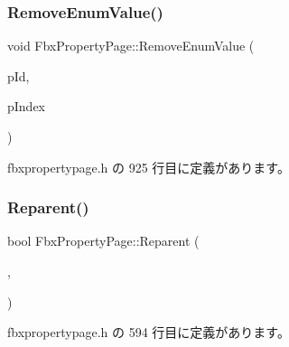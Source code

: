\mbox{\label{class_fbx_property_page_a342af6839e0b286988b8f7fe71f9675c}} 
\subsubsection{\texorpdfstring{Remove\+Enum\+Value()}{RemoveEnumValue()}}
{\footnotesize\ttfamily void Fbx\+Property\+Page\+::\+Remove\+Enum\+Value (\begin{DoxyParamCaption}\item[{\hyperlink{fbxtypes_8h_a088fa96de3b0b3ea69f0f6afef525dfb}{Fbx\+Int}}]{p\+Id,  }\item[{int}]{p\+Index }\end{DoxyParamCaption})\hspace{0.3cm}{\ttfamily [inline]}}



 fbxpropertypage.\+h の 925 行目に定義があります。

\mbox{\label{class_fbx_property_page_a87dae3f5389fc8da0f19cdad06e1a71c}} 
\subsubsection{\texorpdfstring{Reparent()}{Reparent()}}
{\footnotesize\ttfamily bool Fbx\+Property\+Page\+::\+Reparent (\begin{DoxyParamCaption}\item[{\hyperlink{fbxtypes_8h_a088fa96de3b0b3ea69f0f6afef525dfb}{Fbx\+Int}}]{,  }\item[{\hyperlink{fbxtypes_8h_a088fa96de3b0b3ea69f0f6afef525dfb}{Fbx\+Int}}]{ }\end{DoxyParamCaption})\hspace{0.3cm}{\ttfamily [inline]}}



 fbxpropertypage.\+h の 594 行目に定義があります。

\mbox{\label{class_fbx_property_page_a7e58b958d273e25965c6dbbcd6c394e6}} 
